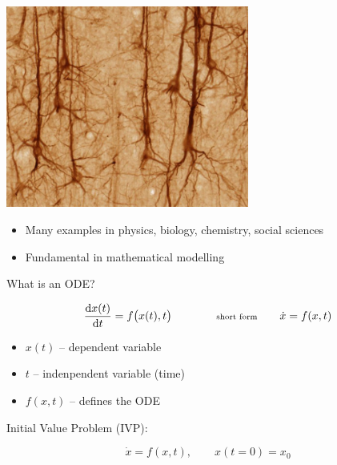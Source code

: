 \documentclass{beamer}
\newcommand{\de}{\mbox{d}}
\newcommand{\heading}[1]{\centerline{\Large #1} \vspace{0.5em}}
\begin{document}
\begin{frame}
\begin{minipage}{0.48\textwidth}
\begin{center}
  \includegraphics[draft=false,width=0.6\textwidth]{neuron.jpg}
 \end{center}
\end{minipage}
\vspace{2ex}

\begin{itemize}
 \item Many examples in physics, biology, chemistry, social sciences
 \item Fundamental in mathematical modelling
\end{itemize}

\end{frame}



\begin{frame}
 
 \heading{What is an ODE?}

 $$\frac{\de x(t)}{\de t} = f\big(x(t) , t\big) \qquad \qquad {\scriptsize \text{short form}} \qquad \dot{x} = f(x,t)
$$

 \begin{itemize}
  \item $x(t)$ -- dependent variable
  \item $t$ -- indenpendent variable (time)
  \item $f(x,t)$ -- defines the ODE
 \end{itemize}

\vspace{4ex}

 Initial Value Problem (IVP):

 $$\dot x = f( x , t ) ,\qquad x(t=0) = x_0$$

\end{frame}
\end{document}
